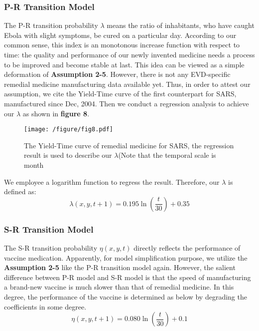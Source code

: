 \subsubsection{P-R Transition Model}
The P-R transition probability $\lambda$ means the ratio of  inhabitants, who have caught Ebola with slight symptoms, be cured on a particular day. According to our common sense, this index is an monotonous increase function with respect to time: the quality and performance of our newly invented medicine needs a process to be improved and become stable at last. This idea can be viewed as a simple deformation of \textbf{Assumption 2-5}. However, there is not any EVD-specific remedial medicine manufacturing data available yet. Thus, in order to attest our assumption, we cite the Yield-Time curve of the first counterpart for SARS, manufactured since Dec, 2004\cite{hensley2004interferon}. Then we conduct a regression analysis to achieve our $\lambda$ as shown in \textbf{figure 8}. 

\begin{figure}[htbp]
\centering
\texttt{[image: /figure/fig8.pdf]}
\caption{The Yield-Time curve of remedial medicine for SARS, the regression result is used to describe our $\lambda$(Note that the temporal scale is month}\label{fig:8}
\end{figure}

We employee a logarithm function to regress the result. Therefore, our $\lambda$ is defined as:
\begin{equation}
\lambda \left( x,y,t+1\right) =0.195\ln \left( \dfrac{t}{30}\right) +0.35
\end{equation}

\subsubsection{S-R Transition Model}
The S-R transition probability $\eta(x,y,t)$ directly reflects the performance of vaccine medication. Apparently, for model simplification purpose, we utilize the \textbf{Assumption 2-5} like the P-R transition model again. However, the salient difference between P-R model and S-R model is that the speed of manufacturing a brand-new vaccine is much slower than that of remedial medicine. In this degree, the performance of the vaccine is determined as below by degrading the coefficients in some degree.
\begin{equation}
\eta \left( x,y,t+1\right) =0.080\ln \left( \dfrac{t}{30}\right) +0.1
\end{equation}

